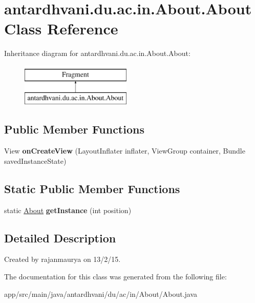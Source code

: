 \hypertarget{classantardhvani_1_1du_1_1ac_1_1in_1_1_about_1_1_about}{}\section{antardhvani.\+du.\+ac.\+in.\+About.\+About Class Reference}
\label{classantardhvani_1_1du_1_1ac_1_1in_1_1_about_1_1_about}
Inheritance diagram for antardhvani.\+du.\+ac.\+in.\+About.\+About\+:\begin{figure}[H]
\begin{center}
\leavevmode
\includegraphics[height=2.000000cm]{classantardhvani_1_1du_1_1ac_1_1in_1_1_about_1_1_about}
\end{center}
\end{figure}
\subsection*{Public Member Functions}
\begin{DoxyCompactItemize}
\item 
\hypertarget{classantardhvani_1_1du_1_1ac_1_1in_1_1_about_1_1_about_aaea3c02ef51f6259b08dfbc4adc575e8}{}View {\bfseries on\+Create\+View} (Layout\+Inflater inflater, View\+Group container, Bundle saved\+Instance\+State)\label{classantardhvani_1_1du_1_1ac_1_1in_1_1_about_1_1_about_aaea3c02ef51f6259b08dfbc4adc575e8}

\end{DoxyCompactItemize}
\subsection*{Static Public Member Functions}
\begin{DoxyCompactItemize}
\item 
\hypertarget{classantardhvani_1_1du_1_1ac_1_1in_1_1_about_1_1_about_adc16b5f7ffb0bd8750158a76b1eae5c0}{}static \hyperlink{classantardhvani_1_1du_1_1ac_1_1in_1_1_about_1_1_about}{About} {\bfseries get\+Instance} (int position)\label{classantardhvani_1_1du_1_1ac_1_1in_1_1_about_1_1_about_adc16b5f7ffb0bd8750158a76b1eae5c0}

\end{DoxyCompactItemize}


\subsection{Detailed Description}
Created by rajanmaurya on 13/2/15. 

The documentation for this class was generated from the following file\+:\begin{DoxyCompactItemize}
\item 
app/src/main/java/antardhvani/du/ac/in/\+About/About.\+java\end{DoxyCompactItemize}
